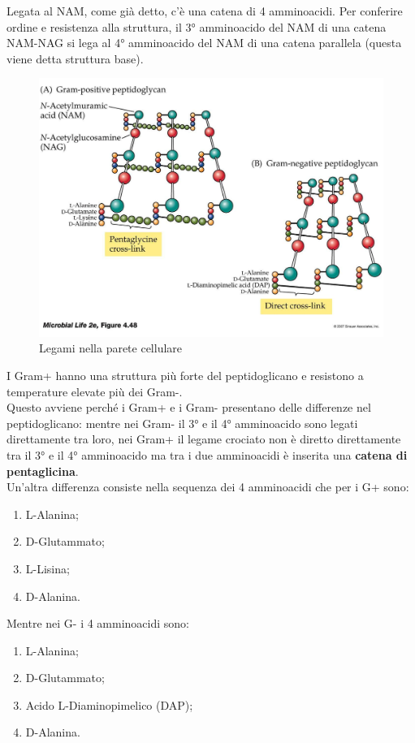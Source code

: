 \documentclass[11pt]{book}
\begin{document}
\vspace{1em}
Legata al NAM, come già detto, c’è una catena di 4 amminoacidi. Per conferire ordine e resistenza alla struttura, il 3° amminoacido del NAM di una catena NAM-NAG si lega al 4° amminoacido del NAM di una catena parallela (questa viene detta struttura base).

\begin{figure}[htp]
\centering
\includegraphics[scale=0.2]{img/NAM_NAG.jpg}
\caption{Legami nella parete cellulare}
\label{Legami parete cellulare}
\end{figure}


\clearpage
I Gram+ hanno una struttura più forte del peptidoglicano e resistono a temperature elevate più dei Gram-.\\
Questo avviene perché i Gram+ e i Gram- presentano delle differenze nel peptidoglicano: mentre nei Gram- il 3° e il 4° amminoacido sono legati direttamente tra loro, nei Gram+ il legame crociato non è diretto direttamente tra il 3° e il 4° amminoacido ma tra i due amminoacidi è inserita una \textbf{catena di pentaglicina}.\\
Un’altra differenza consiste nella sequenza dei 4 amminoacidi che per i G+ sono: 
\begin{enumerate}
\item L-Alanina;
\item D-Glutammato;
\item L-Lisina;
\item D-Alanina.
\end{enumerate}

Mentre nei G- i 4 amminoacidi sono:
\begin{enumerate}
\item L-Alanina;
\item D-Glutammato;
\item Acido L-Diaminopimelico (DAP);
\item D-Alanina.
\end{enumerate}
\end{document}
